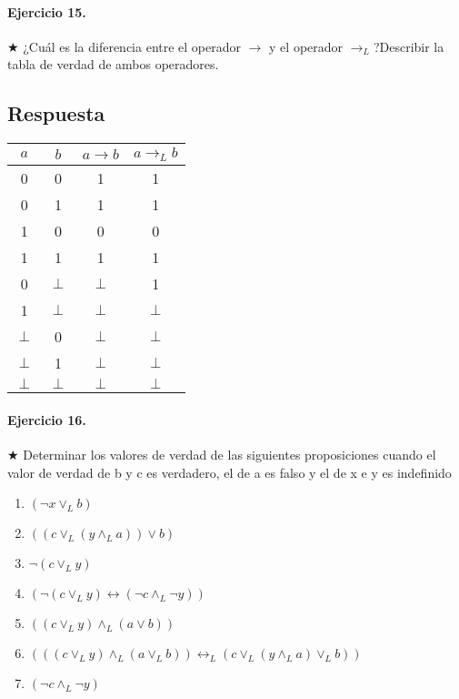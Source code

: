 \documentclass[a4paper]{article}
\begin{document}
\paragraph{\textbf{Ejercicio 15.}} $\bigstar$ ¿Cuál es la diferencia entre el operador $\rightarrow $ y el operador $\rightarrow _{L} $?Describir la tabla de verdad de ambos operadores.

\subsection*{Respuesta}
\begin{center}
\begin{tabular}{|c|c|c|c|}
\hline 
$a$ & $b$ & $a\rightarrow b$ & $a\rightarrow _L b$ \\ 
\hline 
0 & 0 & 1 & 1 \\ 
\hline 
0 & 1 & 1 & 1 \\ 
\hline 
1 & 0 & 0 & 0 \\ 
\hline 
1 & 1 & 1 & 1 \\ 
\hline 
0 & $ \perp$ & $ \perp$ & 1 \\ 
\hline 
1 & $ \perp$ & $ \perp$ &  $\perp$ \\ 
\hline 
$ \perp$ & 0 & $ \perp$ & $ \perp$ \\ 
\hline 
$ \perp$ & 1 & $ \perp$ & $ \perp$ \\ 
\hline 
$ \perp$ & $ \perp$ & $ \perp$ & $ \perp$ \\ 
\hline 
\end{tabular} 
\end{center}

\paragraph{\textbf{Ejercicio 16.}} $\bigstar$ Determinar los valores de verdad de las siguientes proposiciones cuando el valor de verdad de b y c es verdadero, el de a es falso y el de x e y es indefinido 
\begin{multicols}{2}
\begin{enumerate}[label=\alph*)]
\item $( \neg x \vee _L b)$
\item $ ((c \vee _L (y \wedge _L a))\vee b) $
\item $ \neg (c \vee _L y) $
\item $ (\neg (c\vee _L y)\leftrightarrow (\neg c \wedge _L \neg y)) $
\item $ ((c \vee _L y)\wedge _L (a\vee b)) $
\item $(((c\vee _L y)\wedge _L (a \vee _L b))\leftrightarrow _L (c\vee _L (y \wedge _L a)\vee _Lb))$
\item $(\neg c \wedge _L \neg y)$
\end{enumerate}
\end{multicols}
\end{document}
